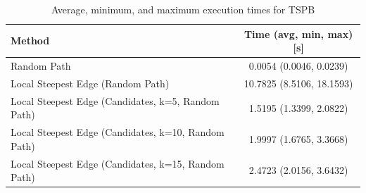 \begin{table}[h!]
\centering
\begin{tabular}{lc}
\hline
Method & Time (avg, min, max) [s] \\
\hline
Random Path & 0.0054 (0.0046, 0.0239) \\
Local Steepest Edge (Random Path) & 10.7825 (8.5106, 18.1593) \\
Local Steepest Edge (Candidates, k=5, Random Path) & 1.5195 (1.3399, 2.0822) \\
Local Steepest Edge (Candidates, k=10, Random Path) & 1.9997 (1.6765, 3.3668) \\
Local Steepest Edge (Candidates, k=15, Random Path) & 2.4723 (2.0156, 3.6432) \\
\hline
\end{tabular}
\caption{Average, minimum, and maximum execution times for TSPB}
\label{tab:TSPB_timings}
\end{table}
